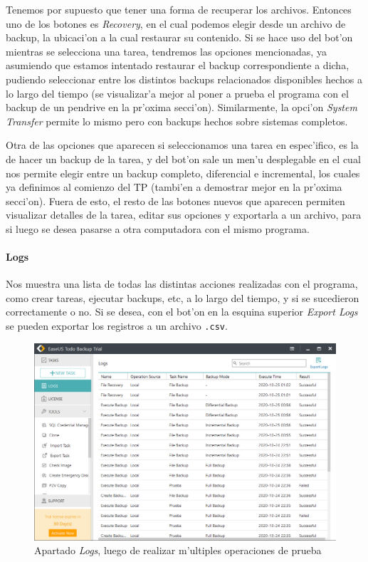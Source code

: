 \documentclass[11pt]{article}
\begin{document}
	Tenemos por supuesto que tener una forma de recuperar los archivos. Entonces uno de los botones es \textit{Recovery}, en el cual podemos elegir desde un archivo de backup, la ubicaci'on a la cual restaurar su contenido. Si se hace uso del bot'on mientras se selecciona una tarea, tendremos las opciones mencionadas, ya asumiendo que estamos intentado restaurar el backup correspondiente a dicha, pudiendo seleccionar entre los distintos backups relacionados disponibles hechos a lo largo del tiempo (se visualizar'a mejor al poner a prueba el programa con el backup de un pendrive en la pr'oxima secci'on). Similarmente, la opci'on \textit{System Transfer} permite lo mismo pero con backups hechos sobre sistemas completos.
	
	Otra de las opciones que aparecen si seleccionamos una tarea en espec'ifico, es la de hacer un backup de la tarea, y del bot'on sale un men'u desplegable en el cual nos permite elegir entre un backup completo, diferencial e incremental, los cuales ya definimos al comienzo del TP (tambi'en a demostrar mejor en la pr'oxima secci'on). Fuera de esto, el resto de las botones nuevos que aparecen permiten visualizar detalles de la tarea, editar sus opciones y exportarla a un archivo, para si luego se desea pasarse a otra computadora con el mismo programa.
	
	
	\paragraph{Logs}
	
	Nos muestra una lista de todas las distintas acciones realizadas con el programa, como crear tareas, ejecutar backups, etc, a lo largo del tiempo, y si se sucedieron correctamente o no. Si se desea, con el bot'on en la esquina superior \textit{Export Logs} se pueden exportar los registros a un archivo \texttt{.csv}.
	
	\begin{figure}[H]
		\centering
		\includegraphics[width=.8\textwidth]{Images/easeus/use_logs}
		\caption{Apartado \textit{Logs}, luego de realizar m'ultiples operaciones de prueba}
	\end{figure} 
	
\end{document}
